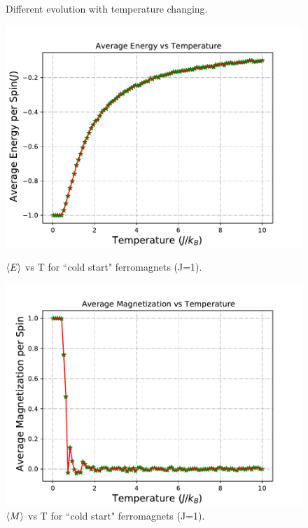 \documentclass[12pt]{article}
\begin{document}
\begin{figure}[H]
		\caption{Different evolution with temperature changing.}
		\label{fig: evolution for differnet temperature}
	\end{figure}
	
	\begin{figure}[H]
		\begin{minipage}[t]{0.5\textwidth}
			\centering
			\includegraphics[scale=0.5]{ave E vs T(J=1).pdf}
			\setcaptionwidth{3in}
			\caption{$\braket{E}$ vs T for ``cold start"  ferromagnets (J=1). }
			\label{fig: cold start average energy}
		\end{minipage}
		\begin{minipage}[t]{0.5\textwidth}
			\centering
			\includegraphics[scale=0.5]{ave M vs T(J=1).pdf}
			\setcaptionwidth{3in}
			\caption{$\braket{M}$ vs T for ``cold start"  ferromagnets (J=1).}
			\label{fig: cold start average magnetization}
		\end{minipage}
	\end{figure}
	
\end{document}
